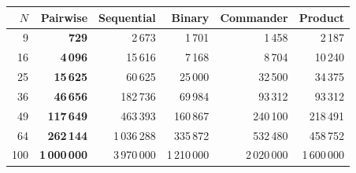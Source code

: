 \begin{tabular}{rrrrrr}
\toprule
$N$ & Pairwise & Sequential & Binary & Commander & Product \\
\midrule
9 & \textbf{729} & 2\,673 & 1\,701 & 1\,458 & 2\,187 \\
16 & \textbf{4\,096} & 15\,616 & 7\,168 & 8\,704 & 10\,240 \\
25 & \textbf{15\,625} & 60\,625 & 25\,000 & 32\,500 & 34\,375 \\
36 & \textbf{46\,656} & 182\,736 & 69\,984 & 93\,312 & 93\,312 \\
49 & \textbf{117\,649} & 463\,393 & 160\,867 & 240\,100 & 218\,491 \\
64 & \textbf{262\,144} & 1\,036\,288 & 335\,872 & 532\,480 & 458\,752 \\
100 & \textbf{1\,000\,000} & 3\,970\,000 & 1\,210\,000 & 2\,020\,000 & 1\,600\,000 \\
\bottomrule
\end{tabular}
